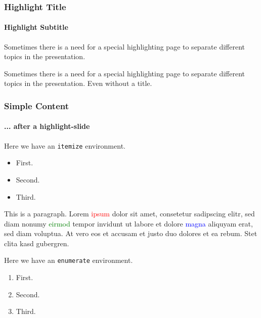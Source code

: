 	 \begin{frame}[highlight]
	    \frametitle{Highlight Title}
	    \framesubtitle{Highlight Subtitle}
	    \centering
	    Sometimes there is a need for a special highlighting page to separate different topics in the presentation.
 	 \end{frame}

      \begin{frame}[highlight]
        \centering
	    Sometimes there is a need for a special highlighting page to separate different topics in the presentation.
	    \vspace{1em}
	    Even without a title.
 	 \end{frame}

	 \begin{frame}
		 \frametitle{Simple Content}
		 \framesubtitle{... after a highlight-slide}
		 Here we have an \texttt{itemize} environment.
		 \begin{itemize}
			 \item First.
			 \item Second.
			 \item Third.
		 \end{itemize}
		 \vspace{1em}

		 This is a paragraph. Lorem \textcolor{red}{ipsum} dolor sit amet, consetetur sadipscing elitr, sed diam nonumy \textcolor{green}{eirmod} tempor invidunt ut labore et dolore \textcolor{blue}{magna} aliquyam erat, sed diam voluptua. At vero eos et accusam et justo duo dolores et ea rebum. Stet clita kasd gubergren.
		 \vspace{1em}

		 Here we have an \texttt{enumerate} environment.
		 \begin{enumerate}
			 \item First.
			 \item Second.
			 \item Third.
		 \end{enumerate}
	 \end{frame}


